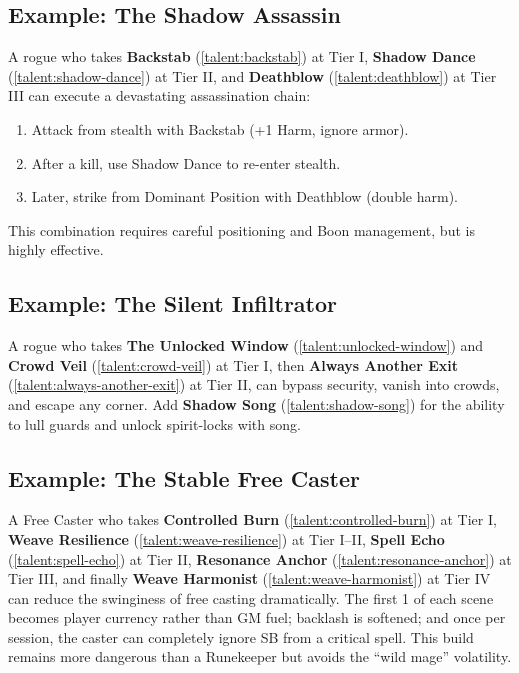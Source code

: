 {\subsection*{Example: The Shadow Assassin}
\label{sec:shadow-assassin-example}
A rogue who takes \textbf{Backstab} (\ref{talent:backstab}) at Tier I, \textbf{Shadow Dance} (\ref{talent:shadow-dance}) at Tier II, and \textbf{Deathblow} (\ref{talent:deathblow}) at Tier III can execute a devastating assassination chain:
\begin{enumerate}
\item Attack from stealth with Backstab (+1 Harm, ignore armor).
\item After a kill, use Shadow Dance to re-enter stealth.
\item Later, strike from Dominant Position with Deathblow (double harm).
\end{enumerate}
This combination requires careful positioning and Boon management, but is highly effective.

\subsection*{Example: The Silent Infiltrator}
\label{sec:silent-infiltrator-example}
A rogue who takes \textbf{The Unlocked Window} (\ref{talent:unlocked-window}) and \textbf{Crowd Veil} (\ref{talent:crowd-veil}) at Tier I, then \textbf{Always Another Exit} (\ref{talent:always-another-exit}) at Tier II, can bypass security, vanish into crowds, and escape any corner. Add \textbf{Shadow Song} (\ref{talent:shadow-song}) for the ability to lull guards and unlock spirit-locks with song.

\subsection*{Example: The Stable Free Caster}
\label{sec:stable-freecaster-example}
A Free Caster who takes \textbf{Controlled Burn} (\ref{talent:controlled-burn}) at Tier I, \textbf{Weave Resilience} (\ref{talent:weave-resilience}) at Tier I--II, \textbf{Spell Echo} (\ref{talent:spell-echo}) at Tier II, \textbf{Resonance Anchor} (\ref{talent:resonance-anchor}) at Tier III, and finally \textbf{Weave Harmonist} (\ref{talent:weave-harmonist}) at Tier IV can reduce the swinginess of free casting dramatically. The first 1 of each scene becomes player currency rather than GM fuel; backlash is softened; and once per session, the caster can completely ignore SB from a critical spell. This build remains more dangerous than a Runekeeper but avoids the ``wild mage'' volatility.

}
